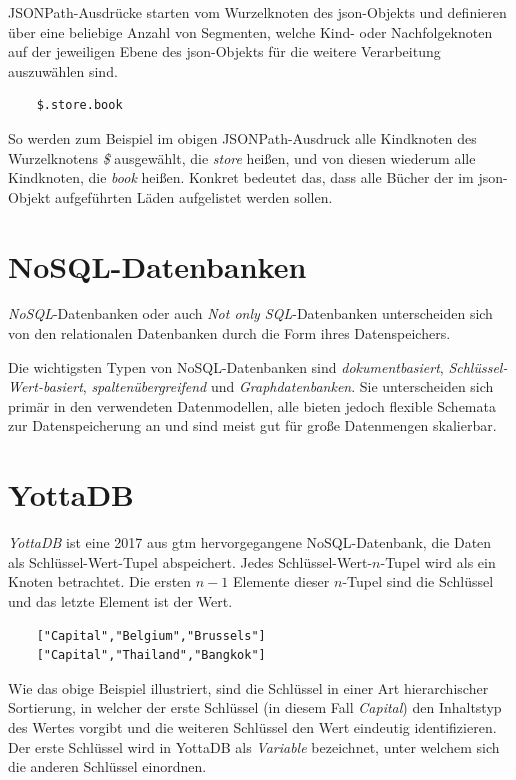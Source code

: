 \documentclass[oneside]{ausarbeitung}
\begin{document}
JSONPath-Ausdrücke starten vom Wurzelknoten des \ac{json}-Objekts und definieren über eine beliebige Anzahl von Segmenten, welche Kind- oder Nachfolgeknoten auf der jeweiligen Ebene des \ac{json}-Objekts für die weitere Verarbeitung auszuwählen sind.
	
\begin{lstlisting}
	$.store.book
\end{lstlisting}
	
So werden zum Beispiel im obigen JSONPath-Ausdruck alle Kindknoten des Wurzelknotens \textit{\$} ausgewählt, die \textit{store} heißen, und von diesen wiederum alle Kindknoten, die \textit{book} heißen. Konkret bedeutet das, dass alle Bücher der im \ac{json}-Objekt aufgeführten Läden aufgelistet werden sollen.
	
	
	
	
\section{NoSQL-Datenbanken}
	
\textit{NoSQL}-Datenbanken oder auch \textit{Not only SQL}-Datenbanken unterscheiden sich von den relationalen Datenbanken durch die Form ihres Datenspeichers. 

Die wichtigsten Typen von NoSQL-Datenbanken sind \textit{dokumentbasiert}, \textit{Schlüssel-Wert-basiert}, \textit{spaltenübergreifend} und \textit{Graphdatenbanken}. Sie unterscheiden sich primär in den verwendeten Datenmodellen, alle bieten jedoch flexible Schemata zur Datenspeicherung an und sind meist gut für große Datenmengen skalierbar.\cite{Schaefer:nosql}

	
	
\pagebreak	
	
\section{YottaDB}
	
\textit{YottaDB} ist eine 2017 aus \ac{gtm} hervorgegangene NoSQL-Datenbank, die Daten als Schlüssel-Wert-Tupel abspeichert. Jedes Schlüssel-Wert-$n$-Tupel wird als ein Knoten betrachtet. Die ersten $n-1$ Elemente dieser $n$-Tupel sind die Schlüssel und das letzte Element ist der Wert. 
	
\begin{lstlisting}
	["Capital","Belgium","Brussels"]
	["Capital","Thailand","Bangkok"]
\end{lstlisting}
	
Wie das obige Beispiel illustriert, sind die Schlüssel in einer Art hierarchischer Sortierung, in welcher der erste Schlüssel (in diesem Fall \textit{Capital}) den Inhaltstyp des Wertes vorgibt und die weiteren Schlüssel den Wert eindeutig identifizieren. Der erste Schlüssel wird in YottaDB als \textit{Variable} bezeichnet, unter welchem sich die anderen Schlüssel einordnen.
	
\end{document}
